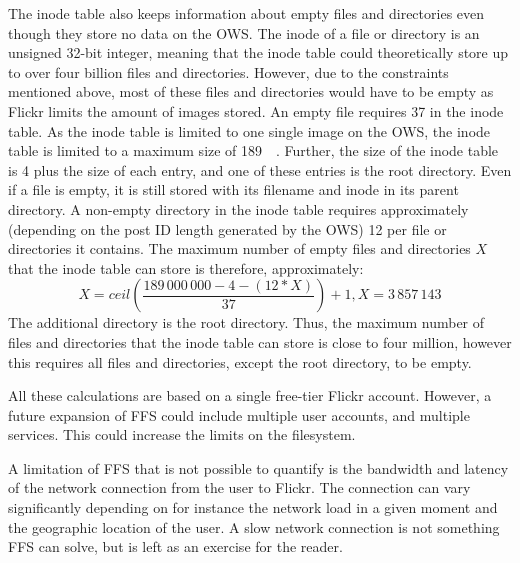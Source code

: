 The inode table also keeps information about empty files and directories even though they store no data on the OWS. The inode of a file or directory is an unsigned 32-bit integer, meaning that the inode table could theoretically store up to over four billion files and directories. However, due to the constraints mentioned above, most of these files and directories would have to be empty as Flickr limits the amount of images stored. An empty file requires \SI{37}{\byte} in the inode table. As the inode table is limited to one single image on the OWS, the inode table is limited to a maximum size of \SI{189}{\mega\byte}. Further, the size of the inode table is \SI{4}{\byte} plus the size of each entry, and one of these entries is the root directory. Even if a file is empty, it is still stored with its filename and inode in its parent directory. A non-empty directory in the inode table requires approximately (depending on the post ID length generated by the OWS) \SI{12}{\byte} per file or directories it contains. The maximum number of empty files and directories $X$ that the inode table can store is therefore, approximately:
$$
	X = ceil(\frac{189\,000\,000 - 4 - (12 * X)}{37}) + 1, X = 3\,857\,143
$$
The additional directory is the root directory. Thus, the maximum number of files and directories that the inode table can store is close to four million, however this requires all files and directories, except the root directory, to be empty.



All these calculations are based on a single free-tier Flickr account. However, a future expansion of FFS could include multiple user accounts, and multiple services. This could increase the limits on the filesystem.


A limitation of FFS that is not possible to quantify is the bandwidth and latency of the network connection from the user to Flickr. The connection can vary significantly depending on for instance the network load in a given moment and the geographic location of the user. A slow network connection is not something FFS can solve, but is left as an exercise for the reader.